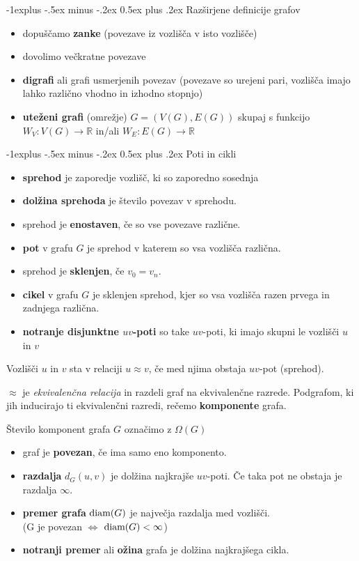 \documentclass[a4paper,9pt]{extarticle}
\makeatletter
\renewcommand{\subsection}{\@startsection{subsection}{2}{0mm}%
                                {-1explus -.5ex minus -.2ex}%
                                {0.5ex plus .2ex}%
                                {\normalfont\normalsize\bfseries}}
\makeatother
\begin{document}
\begin{multicols}{3}
\subsection{Razširjene definicije grafov}
\begin{itemize}
    \item dopuščamo \textbf{zanke} (povezave iz vozlišča v isto vozlišče)
    \item dovolimo večkratne povezave
    \item \textbf{digrafi} ali grafi usmerjenih povezav (povezave so urejeni pari, vozlišča imajo lahko različno vhodno in izhodno stopnjo)
    \item \textbf{uteženi grafi} (omrežje) $G = (V(G), E(G))$ skupaj s funkcijo $W_V : V(G) \to \mathbb{R}$ in/ali $W_E: E(G) \to \mathbb{R}$
\end{itemize}

\subsection{Poti in cikli}
\begin{itemize}
    \item \textbf{sprehod} je zaporedje vozlišč, ki so zaporedno sosednja
    \item \textbf{dolžina sprehoda} je število povezav v sprehodu.
    \item sprehod je \textbf{enostaven}, če so vse povezave različne.
    \item \textbf{pot} v grafu $G$ je sprehod v katerem so vsa vozlišča različna.
    \item sprehod je \textbf{sklenjen}, če $v_0 = v_n$.
    \item \textbf{cikel} v grafu $G$ je sklenjen sprehod, kjer so vsa vozlišča razen prvega in zadnjega različna.
    \item \textbf{notranje disjunktne $uv$-poti} so take $uv$-poti, ki imajo skupni le vozlišči $u$ in $v$
\end{itemize}

Vozlišči $u$ in $v$ sta v relaciji $u \approx v$, če med njima obstaja $uv$-pot (sprehod).

$\approx$ je \emph{ekvivalenčna relacija} in razdeli graf na ekvivalenčne razrede. 
Podgrafom, ki jih inducirajo ti ekvivalenčni razredi, rečemo \textbf{komponente} grafa.

Število komponent grafa $G$ označimo z $\Omega(G)$

\begin{itemize}
    \item graf je \textbf{povezan}, če ima samo eno komponento.
    \item \textbf{razdalja} $d_G(u,v)$ je dolžina najkrajše $uv$-poti. Če taka pot ne obstaja je razdalja $\infty$.
    \item \textbf{premer grafa} $\textmd{diam}(G)$ je največja razdalja med vozlišči.\\
    (G je povezan $\Leftrightarrow$ $\textmd{diam}(G) < \infty$)
    \item \textbf{notranji premer} ali \textbf{ožina} grafa je dolžina najkrajšega cikla.
\end{itemize}


\end{multicols}
\end{document}
